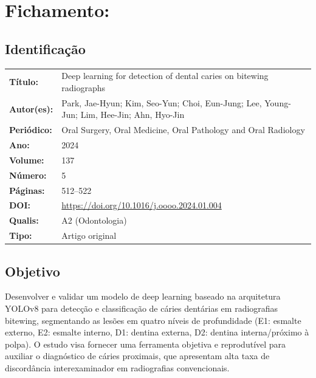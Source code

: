 \section{Fichamento: }

\subsection{Identificação}
\begin{tabular}{ll}
\textbf{Título:} & Deep learning for detection of dental caries on bitewing
radiographs \\
\textbf{Autor(es):} & Park, Jae-Hyun; Kim, Seo-Yun; Choi, Eun-Jung;
Lee, Young-Jun; Lim, Hee-Jin; Ahn, Hyo-Jin \\
\textbf{Periódico:} & Oral Surgery, Oral Medicine, Oral Pathology and Oral Radiology \\
\textbf{Ano:} & 2024 \\
\textbf{Volume:} & 137 \\
\textbf{Número:} & 5 \\
\textbf{Páginas:} & 512--522 \\
\textbf{DOI:} & \url{https://doi.org/10.1016/j.oooo.2024.01.004} \\
\textbf{Qualis:} & A2 (Odontologia) \\
\textbf{Tipo:} & Artigo original \\
\end{tabular}

\subsection{Objetivo}
Desenvolver e validar um modelo de deep learning baseado na arquitetura
YOLOv8 para detecção e classificação de cáries dentárias em radiografias
bitewing, segmentando as lesões em quatro níveis de profundidade (E1:
esmalte externo, E2: esmalte interno, D1: dentina externa, D2: dentina
interna/próximo à polpa). O estudo visa fornecer uma ferramenta objetiva
e reprodutível para auxiliar o diagnóstico de cáries proximais, que
apresentam alta taxa de discordância interexaminador em radiografias
convencionais.

